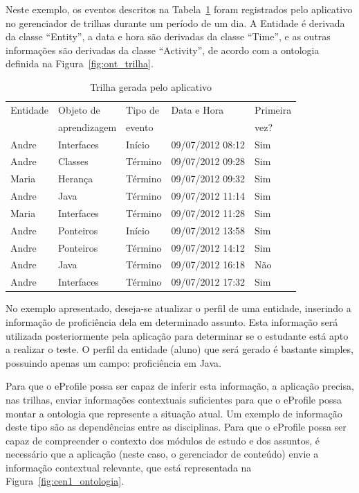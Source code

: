 Neste exemplo, os eventos descritos na Tabela~\ref{tab:eventos} foram registrados pelo aplicativo no gerenciador de trilhas durante um período de um dia. A Entidade é derivada da classe ``Entity'', a data e hora são derivadas da classe ``Time'', e as outras informações são derivadas da classe ``Activity'', de acordo com a ontologia definida na Figura~\ref{fig:ont_trilha}.

\begin{table}\centering\footnotesize
  \begin{tabular*}{0.65\textwidth}{@{}lllll@{}}
    \toprule
    Entidade & Objeto de    & Tipo de & Data e Hora & Primeira \\
             & aprendizagem & evento  &             & vez? \\
    \midrule
    Andre    & Interfaces   & Início  & 09/07/2012 08:12 & Sim \\
    Andre    & Classes      & Término & 09/07/2012 09:28 & Sim \\
    Maria    & Herança      & Término & 09/07/2012 09:32 & Sim \\
    Andre    & Java         & Término & 09/07/2012 11:14 & Sim \\
    Maria    & Interfaces   & Término & 09/07/2012 11:28 & Sim \\
    Andre    & Ponteiros    & Início  & 09/07/2012 13:58 & Sim \\
    Andre    & Ponteiros    & Término & 09/07/2012 14:12 & Sim \\
    Andre    & Java         & Término & 09/07/2012 16:18 & Não \\
    Andre    & Interfaces   & Término & 09/07/2012 17:32 & Sim \\
    \bottomrule
  \end{tabular*}
  \caption{Trilha gerada pelo aplicativo}
  \label{tab:eventos}
\end{table}

No exemplo apresentado, deseja-se atualizar o perfil de uma entidade, inserindo a informação de proficiência dela em determinado assunto. Esta informação será utilizada posteriormente pela aplicação para determinar se o estudante está apto a realizar o teste. O perfil da entidade (aluno) que será gerado é bastante simples, possuindo apenas um campo: proficiência em Java.

Para que o eProfile possa ser capaz de inferir esta informação, a aplicação precisa, nas trilhas, enviar informações contextuais suficientes para que o eProfile possa montar a ontologia que represente a situação atual. Um exemplo de informação deste tipo são as dependências entre as disciplinas. Para que o eProfile possa ser capaz de compreender o contexto dos módulos de estudo e dos assuntos, é necessário que a aplicação (neste caso, o gerenciador de conteúdo) envie a informação contextual relevante, que está representada na Figura~\ref{fig:cen1_ontologia}.

